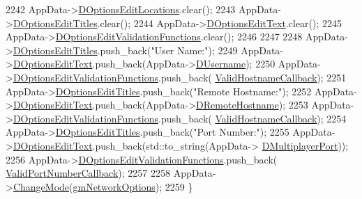 \begin{DoxyCode}
2242     AppData->\hyperlink{classCApplicationData_ab4e6804c6e50cca45ab3c3071588da34}{DOptionsEditLocations}.clear();
2243     AppData->\hyperlink{classCApplicationData_a7a322ef6b8c1db3e995c6b493230fd05}{DOptionsEditTitles}.clear();
2244     AppData->\hyperlink{classCApplicationData_a7044dc34cbd9d6776e8ef79eb12b5ce4}{DOptionsEditText}.clear();
2245     AppData->\hyperlink{classCApplicationData_ab76fa444142de66fdb058f390e01112c}{DOptionsEditValidationFunctions}.clear();
2246     
2247     
2248     AppData->\hyperlink{classCApplicationData_a7a322ef6b8c1db3e995c6b493230fd05}{DOptionsEditTitles}.push\_back(\textcolor{stringliteral}{"User Name:"});
2249     AppData->\hyperlink{classCApplicationData_a7044dc34cbd9d6776e8ef79eb12b5ce4}{DOptionsEditText}.push\_back(AppData->\hyperlink{classCApplicationData_aedfdb512317e5b62d0bbbcddcd48dfb8}{DUsername});
2250     AppData->\hyperlink{classCApplicationData_ab76fa444142de66fdb058f390e01112c}{DOptionsEditValidationFunctions}.push\_back(
      \hyperlink{classCApplicationData_aad04c7da1cc86bef623efda1019907fd}{ValidHostnameCallback});
2251     AppData->\hyperlink{classCApplicationData_a7a322ef6b8c1db3e995c6b493230fd05}{DOptionsEditTitles}.push\_back(\textcolor{stringliteral}{"Remote Hostname:"});
2252     AppData->\hyperlink{classCApplicationData_a7044dc34cbd9d6776e8ef79eb12b5ce4}{DOptionsEditText}.push\_back(AppData->\hyperlink{classCApplicationData_a09da79011ab5ce6d6108d1c20f0e7c69}{DRemoteHostname});
2253     AppData->\hyperlink{classCApplicationData_ab76fa444142de66fdb058f390e01112c}{DOptionsEditValidationFunctions}.push\_back(
      \hyperlink{classCApplicationData_aad04c7da1cc86bef623efda1019907fd}{ValidHostnameCallback});
2254     AppData->\hyperlink{classCApplicationData_a7a322ef6b8c1db3e995c6b493230fd05}{DOptionsEditTitles}.push\_back(\textcolor{stringliteral}{"Port Number:"});
2255     AppData->\hyperlink{classCApplicationData_a7044dc34cbd9d6776e8ef79eb12b5ce4}{DOptionsEditText}.push\_back(std::to\_string(AppData->
      \hyperlink{classCApplicationData_a99bed2c18513304de1cf2a2344bf091f}{DMultiplayerPort}));
2256     AppData->\hyperlink{classCApplicationData_ab76fa444142de66fdb058f390e01112c}{DOptionsEditValidationFunctions}.push\_back(
      \hyperlink{classCApplicationData_adc8125cc7c4ad01bdd43e6550c6ba133}{ValidPortNumberCallback});
2257 
2258     AppData->\hyperlink{classCApplicationData_aee18c113e9a0acb3cad3d63eb19de71b}{ChangeMode}(\hyperlink{classCApplicationData_ac8ac37a4c8bb871036fbbdc6a072e403a464109af3d31201d5dc8966512afd480}{gmNetworkOptions});
2259 \}
\end{DoxyCode}
